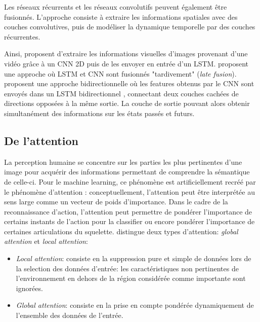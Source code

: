 Les réseaux récurrents et les réseaux convolutifs peuvent également être fusionnés. L'approche consiste à extraire les informations spatiales avec des couches convolutives, puis de modéliser la dynamique temporelle par des couches récurrentes.

Ainsi, \cite{donahue2015long} proposent d'extraire les informations visuelles d'images provenant d'une vidéo grâce à un CNN 2D puis de les envoyer en entrée d'un LSTM.
\cite{li2017skeleton} proposent une approche où LSTM et CNN sont fusionnés "tardivement" (\textit{late fusion}). \cite{ullah2017action} proposent une approche bidirectionnelle où les features obtenus par le CNN sont envoyés dans un LSTM bidirectionnel \cite{Schuster97bidirectionalrecurrent}, connectant deux couches cachées de directions opposées à la même sortie. La couche de sortie pouvant alors obtenir simultanément des informations sur les états passés et futurs.

\subsection{De l'attention}
La perception humaine se concentre sur les parties les plus pertinentes d'une image pour acquérir des informations permettant de comprendre la sémantique de celle-ci. Pour le machine learning, ce phénomène est artificiellement recréé  par le phénomène d'attention \cite{bahdanau2014neural,2017arXiv170603762V}: conceptuellement, l'attention peut être interprétée au sens large comme un vecteur de poids d'importance. 
Dans le cadre de la reconnaissance d'action, l'attention peut permettre de pondérer l'importance de certains instants de l'action pour la classifier ou encore pondérer l'importance de certaines articulations du squelette.
\cite{luong2015effective} distingue deux types d'attention: \textit{global attention} et \textit{local attention}:
 \begin{itemize}
     \item \textit{Local attention}: consiste en la suppression pure et simple de données lors de la selection des données d'entrée: les caractéristiques non pertinentes de l'environnement en dehors de la région considérée comme importante sont ignorées.
     \item \textit{Global attention}: consiste en la prise en compte pondérée dynamiquement de l'ensemble des données de l'entrée.
 \end{itemize}
 
 
